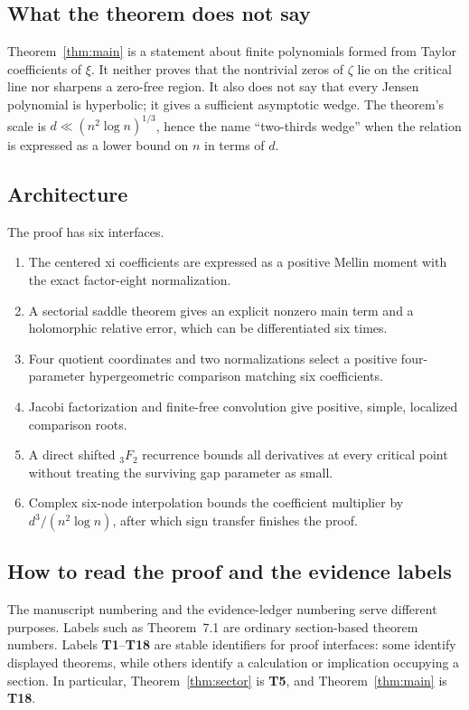 \documentclass[12pt]{article}
\begin{document}
\subsection{What the theorem does not say}

Theorem~\ref{thm:main} is a statement about finite polynomials formed from
Taylor coefficients of $\xi$.  It neither proves that the nontrivial zeros
of $\zeta$ lie on the critical line nor sharpens a zero-free region.  It also
does not say that every Jensen polynomial is hyperbolic; it gives a
sufficient asymptotic wedge.  The theorem's scale is
$d\ll(n^2\log n)^{1/3}$, hence the name ``two-thirds wedge'' when the
relation is expressed as a lower bound on $n$ in terms of $d$.

\subsection{Architecture}

The proof has six interfaces.
\begin{enumerate}
\item The centered xi coefficients are expressed as a positive Mellin moment
with the exact factor-eight normalization.
\item A sectorial saddle theorem gives an explicit nonzero main term and a
holomorphic relative error, which can be differentiated six times.
\item Four quotient coordinates and two normalizations select a positive
four-parameter hypergeometric comparison matching six coefficients.
\item Jacobi factorization and finite-free convolution give positive, simple,
localized comparison roots.
\item A direct shifted ${}_3F_2$ recurrence bounds all derivatives at every
critical point without treating the surviving gap parameter as small.
\item Complex six-node interpolation bounds the coefficient multiplier by
$d^3/(n^2\log n)$, after which sign transfer finishes the proof.
\end{enumerate}

\subsection{How to read the proof and the evidence labels}

The manuscript numbering and the evidence-ledger numbering serve different
purposes.  Labels such as Theorem~7.1 are ordinary section-based theorem
numbers.  Labels \textbf{T1}--\textbf{T18} are stable identifiers for proof
interfaces: some identify displayed theorems, while others identify a
calculation or implication occupying a section.  In particular,
Theorem~\ref{thm:sector} is \textbf{T5}, and
Theorem~\ref{thm:main} is \textbf{T18}.
\end{document}
